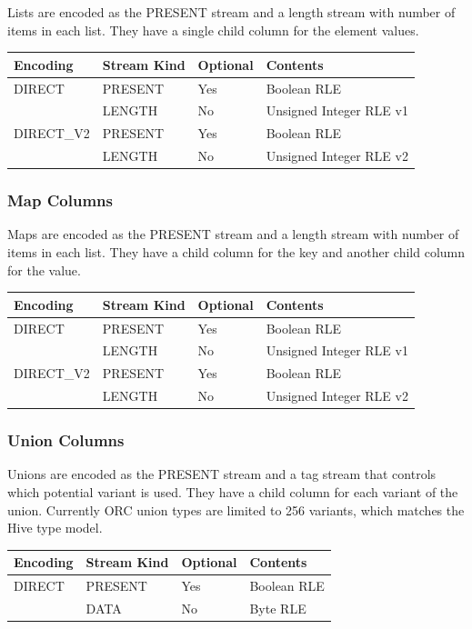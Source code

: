 \documentclass{article}
\begin{document}
Lists are encoded as the PRESENT stream and a length stream with
number of items in each list. They have a single child column for the
element values.

\vspace{10pt}
\begin{tabular}{| l | l | l | l |}
\hline
Encoding & Stream Kind & Optional & Contents \\
\hline
DIRECT & PRESENT & Yes & Boolean RLE\\
       & LENGTH  & No  & Unsigned Integer RLE v1\\
\hline
DIRECT\_V2 & PRESENT & Yes & Boolean RLE\\
           & LENGTH  & No  & Unsigned Integer RLE v2\\
\hline
\end{tabular}

\subsubsection{Map Columns}

Maps are encoded as the PRESENT stream and a length stream with number
of items in each list. They have a child column for the key and
another child column for the value.

\vspace{10pt}
\begin{tabular}{| l | l | l | l |}
\hline
Encoding & Stream Kind & Optional & Contents \\
\hline
DIRECT & PRESENT & Yes & Boolean RLE\\
       & LENGTH  & No  & Unsigned Integer RLE v1\\
\hline
DIRECT\_V2 & PRESENT & Yes & Boolean RLE\\
           & LENGTH  & No  & Unsigned Integer RLE v2\\
\hline
\end{tabular}

\subsubsection{Union Columns}

Unions are encoded as the PRESENT stream and a tag stream that controls which
potential variant is used. They have a child column for each variant of the
union. Currently ORC union types are limited to 256 variants, which matches 
the Hive type model.

\vspace{10pt}
\begin{tabular}{| l | l | l | l |}
\hline
Encoding & Stream Kind & Optional & Contents \\
\hline
DIRECT & PRESENT & Yes & Boolean RLE\\
       & DATA    & No  & Byte RLE\\
\hline
\end{tabular}
\end{document}
